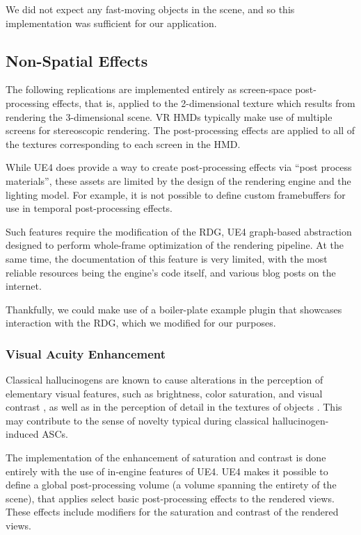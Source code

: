 We did not expect any fast-moving objects in the scene, and so this implementation was sufficient for our application.

\subsection{Non-Spatial Effects}
The following replications are implemented entirely as screen-space post-processing effects, that is, applied to the 2-dimensional texture which results from rendering the 3-dimensional scene. \Ac{VR} \acp{HMD} typically make use of multiple screens for stereoscopic rendering. The post-processing effects are applied to all of the textures corresponding to each screen in the \ac{HMD}.

While \ac{UE4} does provide a way to create post-processing effects via ``post process materials'', these assets are limited by the design of the rendering engine and the lighting model. For example, it is not possible to define custom framebuffers for use in temporal post-processing effects.

Such features require the modification of the \ac{RDG}, \ac{UE4} graph-based abstraction designed to perform whole-frame optimization of the rendering pipeline. At the same time, the documentation of this feature is very limited, with the most reliable resources being the engine's code itself, and various blog posts on the internet.

Thankfully, we could make use of a boiler-plate example plugin \autocite{astral2021postprocess} that showcases interaction with the \ac{RDG}, which we modified for our purposes.

\subsubsection{Visual Acuity Enhancement}
Classical hallucinogens are known to cause alterations in the perception of elementary visual features, such as brightness, color saturation, and visual contrast
\autocites{kluver1942mechanisms}{kluver1966mescal}{dittrich1998standardized}{diaz2010sacred}{siegel1975drug}{fischer1969effects}, as well as in the perception of detail in the textures of objects \autocite{pw2020acuity}. This may contribute to the sense of novelty typical during classical hallucinogen-induced \acp{ASC}.

The implementation of the enhancement of saturation and contrast is done entirely with the use of in-engine features of \ac{UE4}. \ac{UE4} makes it possible to define a global post-processing volume (a volume spanning the entirety of the scene), that applies select basic post-processing effects to the rendered views. These effects include modifiers for the saturation and contrast of the rendered views.

